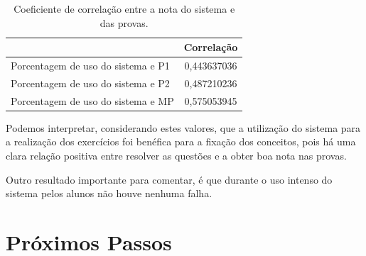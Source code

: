 \documentclass[
	12pt,				%
	openany,
	oneside,
	a4paper,			%
	english,			%
	brazil				%
	]{abntex2}
\begin{document}
\begin{table}[H]
  \centering
  \begin{tabular}{l|c} %
                                       & Correlação \\ \hline 
    Porcentagem de uso do sistema e P1 & 0,443637036 \\ %
    Porcentagem de uso do sistema e P2 & 0,487210236 \\ %
    Porcentagem de uso do sistema e MP & 0,575053945 \\ %
  \end{tabular} 
  \caption{Coeficiente de correlação entre a nota do sistema e das provas.}
  \vspace{-0.5cm}
\end{table}
  
  Podemos interpretar, considerando estes valores, que a utilização do sistema para a realização dos exercícios foi benéfica para a fixação dos conceitos, pois há uma clara relação positiva entre resolver as questões e a obter boa nota nas provas.

  Outro resultado importante para comentar, é que durante o uso intenso do sistema pelos alunos não houve nenhuma falha. %
  
  
 
 
 


\chapter[Próximos Passos]{Próximos Passos}%
\end{document}
